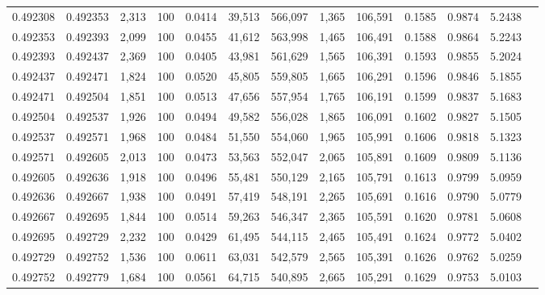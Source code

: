 \begin{tabular}{rrrrrrrrrrrrr}
0.492308 & 0.492353 & 2,313 & 100 &                                     0.0414 &  39,513 & 566,097 &   1,365 & 106,591 & 0.1585 & 0.9874 & 5.2438 \\
0.492353 & 0.492393 & 2,099 & 100 &                                     0.0455 &  41,612 & 563,998 &   1,465 & 106,491 & 0.1588 & 0.9864 & 5.2243 \\
0.492393 & 0.492437 & 2,369 & 100 &                                     0.0405 &  43,981 & 561,629 &   1,565 & 106,391 & 0.1593 & 0.9855 & 5.2024 \\
0.492437 & 0.492471 & 1,824 & 100 &                                     0.0520 &  45,805 & 559,805 &   1,665 & 106,291 & 0.1596 & 0.9846 & 5.1855 \\
0.492471 & 0.492504 & 1,851 & 100 &                                     0.0513 &  47,656 & 557,954 &   1,765 & 106,191 & 0.1599 & 0.9837 & 5.1683 \\
0.492504 & 0.492537 & 1,926 & 100 &                                     0.0494 &  49,582 & 556,028 &   1,865 & 106,091 & 0.1602 & 0.9827 & 5.1505 \\
0.492537 & 0.492571 & 1,968 & 100 &                                     0.0484 &  51,550 & 554,060 &   1,965 & 105,991 & 0.1606 & 0.9818 & 5.1323 \\
0.492571 & 0.492605 & 2,013 & 100 &                                     0.0473 &  53,563 & 552,047 &   2,065 & 105,891 & 0.1609 & 0.9809 & 5.1136 \\
0.492605 & 0.492636 & 1,918 & 100 &                                     0.0496 &  55,481 & 550,129 &   2,165 & 105,791 & 0.1613 & 0.9799 & 5.0959 \\
0.492636 & 0.492667 & 1,938 & 100 &                                     0.0491 &  57,419 & 548,191 &   2,265 & 105,691 & 0.1616 & 0.9790 & 5.0779 \\
0.492667 & 0.492695 & 1,844 & 100 &                                     0.0514 &  59,263 & 546,347 &   2,365 & 105,591 & 0.1620 & 0.9781 & 5.0608 \\
0.492695 & 0.492729 & 2,232 & 100 &                                     0.0429 &  61,495 & 544,115 &   2,465 & 105,491 & 0.1624 & 0.9772 & 5.0402 \\
0.492729 & 0.492752 & 1,536 & 100 &                                     0.0611 &  63,031 & 542,579 &   2,565 & 105,391 & 0.1626 & 0.9762 & 5.0259 \\
0.492752 & 0.492779 & 1,684 & 100 &                                     0.0561 &  64,715 & 540,895 &   2,665 & 105,291 & 0.1629 & 0.9753 & 5.0103 \\

\end{tabular}
